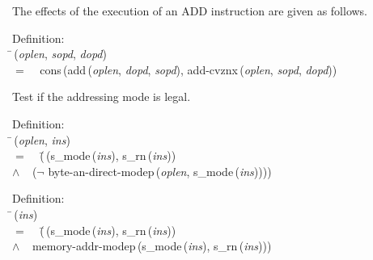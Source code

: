  The effects of the execution of an ADD instruction are given as follows.
\begin{tabbing}{\sc Definition}: \\  
\=\,({\it{oplen\/}}, {\it{sopd\/}}, {\it{dopd\/}}) \\ 
$=$$\;\;\;\;${\rm{cons}}\,({\rm{add}}\,({\it{oplen\/}}, {\it{dopd\/}}, {\it{sopd\/}}), {\rm{add-cvznx}}\,({\it{oplen\/}}, {\it{sopd\/}}, {\it{dopd\/}}))\-
\end{tabbing}

 Test if the addressing mode is legal.
\begin{tabbing}{\sc Definition}: \\  
\=\,({\it{oplen\/}}, {\it{ins\/}}) \\ 
$=$$\;\;\;\;$(\=\,({\rm{s\_mode}}\,({\it{ins\/}}), {\rm{s\_rn}}\,({\it{ins\/}})) \\ 
$\wedge$$\;\;\;\;$($\neg$ {\rm{byte-an-direct-modep}}\,({\it{oplen\/}}, {\rm{s\_mode}}\,({\it{ins\/}}))))\-\-
\end{tabbing}

\begin{tabbing}{\sc Definition}: \\  
\=\,({\it{ins\/}}) \\ 
$=$$\;\;\;\;$(\=\,({\rm{s\_mode}}\,({\it{ins\/}}), {\rm{s\_rn}}\,({\it{ins\/}})) \\ 
$\wedge$$\;\;\;\;${\rm{memory-addr-modep}}\,({\rm{s\_mode}}\,({\it{ins\/}}), {\rm{s\_rn}}\,({\it{ins\/}})))\-\-
\end{tabbing}

